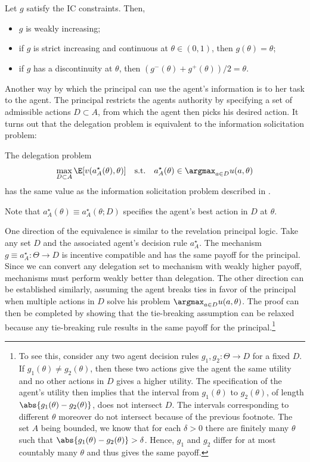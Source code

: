 \begin{proposition}\label{prop:delegation-IC-properties}
  Let \(g\) satisfy the IC constraints.
  Then,
  \begin{itemize}
    \item \(g\) is weakly increasing;
    \item if \(g\) is strict increasing and continuous at \(\theta \in (0, 1)\), then \(g(\theta) = \theta\);
    \item if \(g\) has a discontinuity at \(\theta\), then \((g^-(\theta) + g^+(\theta)) / 2 = \theta\).
  \end{itemize}
\end{proposition}

Another way by which the principal can use the agent's information is to  her task to the agent.
The principal restricts the agents authority by specifying a set of admissible actions \(D \subset A\), from which the agent then picks his desired action.
It turns out that the delegation problem is equivalent to the information solicitation problem:
\begin{lemma}
  The delegation problem
  \[
    \max_{D \subset A} \E[v(a_A^\star(\theta), \theta)]
    \quad\text{s.t.}\quad
    a_A^\star(\theta) \in \argmax_{a \in D} u(a, \theta)
  \]
  has the same value as the information solicitation problem described in .
\end{lemma}
Note that \(a_A^\star(\theta) \equiv a_A^\star(\theta; D)\) specifies the agent's best action in \(D\) at \(\theta\).

One direction of the equivalence is similar to the revelation principal logic.
Take any set \(D\) and the associated agent's decision rule \(a_A^\star\).
The mechanism \(g \equiv a_A^\star: \Theta \to D\) is incentive compatible and has the same payoff for the principal.
Since we can convert any delegation set to mechanism with weakly higher payoff, mechanisms must perform weakly better than delegation.
The other direction can be established similarly, assuming the agent breaks ties in favor of the principal when multiple actions in \(D\) solve his problem \(\argmax_{a \in D} u(a, \theta)\).
The proof can then be completed by showing that the tie-breaking assumption can be relaxed because any tie-breaking rule results in the same payoff for the principal.\footnote{To see this, consider any two agent decision rules \(g_1, g_2: \Theta \to D\) for a fixed \(D\). If \(g_1(\theta) \neq g_2(\theta)\), then these two actions give the agent the same utility and no other actions in \(D\) gives a higher utility. The specification of the agent's utility then implies that the interval from \(g_1(\theta)\) to \(g_2(\theta)\), of length \(\abs{g_1(\theta) - g_2(\theta)}\), does not intersect \(D\). The intervals corresponding to different \(\theta\) moreover do not intersect because of the previous footnote. The set \(A\) being bounded, we know that for each \(\delta > 0\) there are finitely many \(\theta\) such that \(\abs{g_1(\theta) - g_2(\theta)} > \delta\). Hence, \(g_1\) and \(g_2\) differ for at most countably many \(\theta\) and thus gives the same payoff.}

